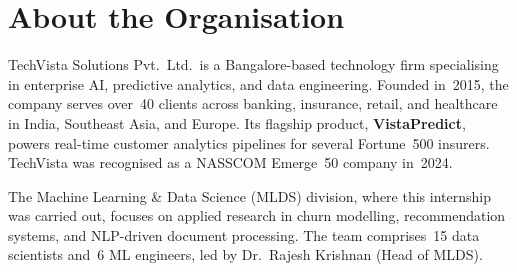 \section{About the Organisation}

TechVista Solutions Pvt.\ Ltd.\ is a Bangalore-based technology firm specialising
in enterprise AI, predictive analytics, and data engineering. Founded in~2015, the
company serves over~40 clients across banking, insurance, retail, and healthcare in
India, Southeast Asia, and Europe. Its flagship product, \textbf{VistaPredict},
powers real-time customer analytics pipelines for several Fortune~500 insurers.
TechVista was recognised as a NASSCOM Emerge~50 company in~2024.

The Machine Learning \& Data Science (MLDS) division, where this internship was
carried out, focuses on applied research in churn modelling, recommendation
systems, and NLP-driven document processing. The team comprises~15 data
scientists and~6 ML engineers, led by Dr.\ Rajesh Krishnan (Head of MLDS).

